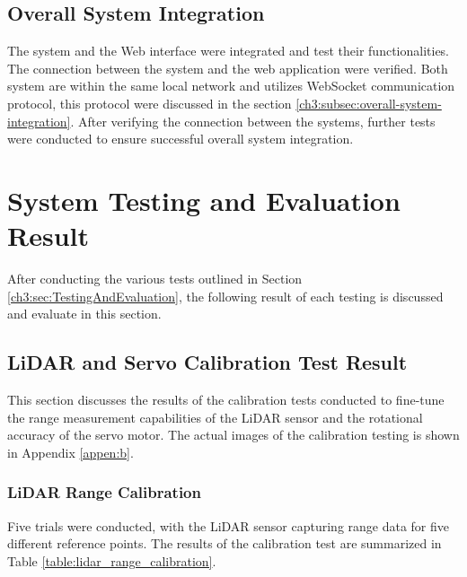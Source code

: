 \subsection{Overall System Integration}
The system and the Web interface were integrated and test their functionalities. The connection between the system and the web application were verified. Both system are within the same local network and utilizes WebSocket communication protocol, this protocol were discussed in the section \ref{ch3:subsec:overall-system-integration}. After verifying the connection between the systems, further tests were conducted to ensure successful overall system integration.
\section{System Testing and Evaluation Result}

After conducting the various tests outlined in Section \ref{ch3:sec:TestingAndEvaluation}, the following result of each testing  is discussed and evaluate in this section.

\subsection{LiDAR and Servo Calibration Test Result}
This section discusses the results of the calibration tests conducted to fine-tune the range measurement capabilities of the LiDAR sensor and the rotational accuracy of the servo motor. The actual images of the calibration testing is shown in Appendix \ref{appen:b}.
\subsubsection{LiDAR Range Calibration}
Five trials were conducted, with the LiDAR sensor capturing range data for five different reference points. The results of the calibration test are summarized in Table \ref{table:lidar_range_calibration}. \\

